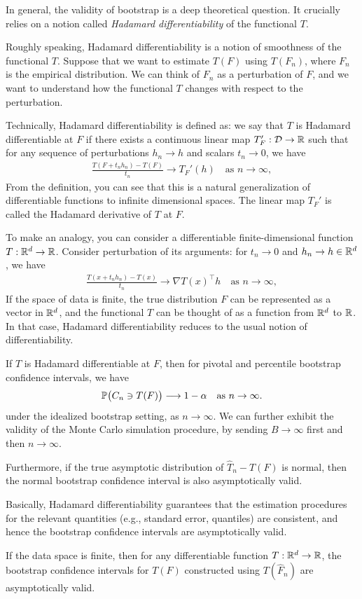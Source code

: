 \documentclass[11pt,letterpaper]{article}
\numberwithin{assumption}{lecture}
\numberwithin{theorem}{lecture}
\numberwithin{proposition}{lecture}
\numberwithin{lemma}{lecture}
\numberwithin{claim}{lecture}
\numberwithin{corollary}{lecture}
\numberwithin{definition}{lecture}
\numberwithin{conjecture}{lecture}
\numberwithin{remark}{lecture}
\numberwithin{example}{lecture}
\numberwithin{equation}{lecture}
\begin{document}
In general, the validity of bootstrap is a deep theoretical question. It crucially relies on a notion called \emph{Hadamard differentiability} of the functional $T$.

Roughly speaking, Hadamard differentiability is a notion of smoothness of the functional $T$. Suppose that we want to estimate $T (F)$ using $T(F_n)$, where $F_n$ is the empirical distribution. We can think of $F_n$ as a perturbation of $F$, and we want to understand how the functional $T$ changes with respect to the perturbation.

Technically, Hadamard differentiability is defined as: we say that $T$ is Hadamard differentiable at $F$ if there exists a continuous linear map $T_F': \mathcal{D} \to \mathbb{R}$ such that for any sequence of perturbations $h_n \rightarrow h$ and scalars $t_n \to 0$, we have
\begin{align*}
  \frac{T (F + t_n h_n) - T (F)}{t_n} \longrightarrow T_F' (h) \quad \text{as } n \to \infty,
\end{align*}
From the definition, you can see that this is a natural generalization of differentiable functions to infinite dimensional spaces. The linear map $T_F'$ is called the Hadamard derivative of $T$ at $F$.

{\color{blue}
To make an analogy, you can consider a differentiable finite-dimensional function $T: \mathbb{R}^d \to \mathbb{R}$. Consider perturbation of its arguments: for $t_n \rightarrow 0$ and $h_n \to h \in \mathbb{R}^d$, we have
\begin{align*}
  \frac{T (x + t_n h_n) - T (x)}{t_n} \longrightarrow \nabla T (x)^\top h \quad \text{as } n \to \infty,
\end{align*}
}
If the space of data is finite, the true distribution $F$ can be represented as a vector in $\mathbb{R}^d$, and the functional $T$ can be thought of as a function from $\mathbb{R}^d$ to $\mathbb{R}$. In that case, Hadamard differentiability reduces to the usual notion of differentiability.

\begin{theorem}
  If $T$ is Hadamard differentiable at $F$, then for pivotal and percentile bootstrap confidence intervals, we have
  \begin{align*}
    {\mathbb{P}} \big( C_n \ni T(F) \big) \longrightarrow 1 - \alpha \quad \text{as } n \to \infty.
  \end{align*}
  under the idealized bootstrap setting, as $n \to \infty$. We can further exhibit the validity of the Monte Carlo simulation procedure, by sending $B \to \infty$ first and then $n \to \infty$.

  Furthermore, if the true asymptotic distribution of $\widehat{T}_n - T(F)$ is normal, then the normal bootstrap confidence interval is also asymptotically valid.
\end{theorem}
Basically, Hadamard differentiability guarantees that the estimation procedures for the relevant quantities (e.g., standard error, quantiles) are consistent, and hence the bootstrap confidence intervals are asymptotically valid.

\begin{corollary}
 If the data space is finite, then for any differentiable function $T: \mathbb{R}^d \to \mathbb{R}$, the bootstrap confidence intervals for $T(F)$ constructed using $T (\widehat{F}_n)$ are asymptotically valid.
\end{corollary}
\end{document}
